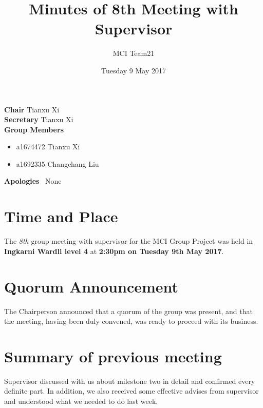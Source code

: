 \documentclass[11pt, a4paper]{article}
\begin{document}
\title{Minutes of 8th Meeting with Supervisor}
\author{MCI Team21}
\date{Tuesday 9 May 2017}
\maketitle

\vspace*{15pt}

\begin{center}
\begin{flushleft}
  \textbf{Chair}      \qquad Tianxu Xi\\
  \textbf{Secretary}   \qquad Tianxu Xi\\
  \textbf{Group Members}
  \begin {itemize}
  		\item a1674472 Tianxu Xi
		\item a1692335 Changchang Liu

  \end{itemize} 
  \textbf{Apologies}  \ None\\
\end{flushleft}
\end{center}




\vspace*{10pt}

\section{Time and Place}
The \emph{8th} group meeting with supervisor for the MCI Group Project was held in \textbf{Ingkarni Wardli level 4} at \textbf{2:30pm on Tuesday 9th May 2017}.
 
\section{Quorum Announcement}
The Chairperson announced that a quorum of the group was present, and that the meeting, having been duly convened, was ready to proceed with its business.

\section{Summary of previous meeting}
Supervisor discussed with us about milestone two in detail and confirmed every definite part. In addition, we also received some effective advises from supervisor and understood what we needed to do last week.
\end{document}
